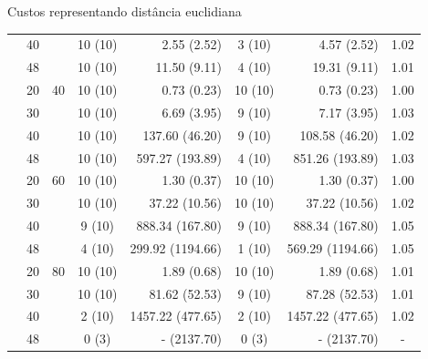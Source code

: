 \documentclass[dvipsnames]{beamer}
\begin{document}
\begin{frame}{Custos representando distância euclidiana}
{\begin{table}
\begin{tabular}{|c|c|c|c|r|c|r|c|}
 & 40 & & 10 (10) & 2.55 (2.52) & 3 (10) & 4.57 (2.52) & 1.02 \\
 & 48 & & 10 (10) & 11.50 (9.11) & 4 (10) & 19.31 (9.11) & 1.01 \\
 & 20 & 40 & 10 (10) & 0.73 (0.23) & 10 (10) & 0.73 (0.23) & 1.00 \\
 & 30 & & 10 (10) & 6.69 (3.95) & 9 (10) & 7.17 (3.95) & 1.03 \\
 & 40 & & 10 (10) & 137.60 (46.20) & 9 (10) & 108.58 (46.20) & 1.02 \\
 & 48 & & 10 (10) & 597.27 (193.89) & 4 (10) & 851.26 (193.89) & 1.03 \\
 & 20 & 60 & 10 (10) & 1.30 (0.37) & 10 (10) & 1.30 (0.37) & 1.00 \\
 & 30 & & 10 (10) & 37.22 (10.56) & 10 (10) & 37.22 (10.56) & 1.02 \\
 & 40 & & 9 (10) & 888.34 (167.80) & 9 (10) & 888.34 (167.80) & 1.05 \\
 & 48 & & 4 (10) & 299.92 (1194.66) & 1 (10) & 569.29 (1194.66) & 1.05 \\
 & 20 & 80 & 10 (10) & 1.89 (0.68) & 10 (10) & 1.89 (0.68) & 1.01 \\
 & 30 & & 10 (10) & 81.62 (52.53) & 9 (10) & 87.28 (52.53) & 1.01 \\
 & 40 & & 2 (10) & 1457.22 (477.65) & 2 (10) & 1457.22 (477.65) & 1.02 \\
\rowcolor[rgb]{1,1,0} & 48 & & 0 (3) & - (2137.70) & 0 (3) & - (2137.70) & - \\

\hline\hline
\end{tabular}
\end{table}
}
  
\end{frame}
\end{document}
